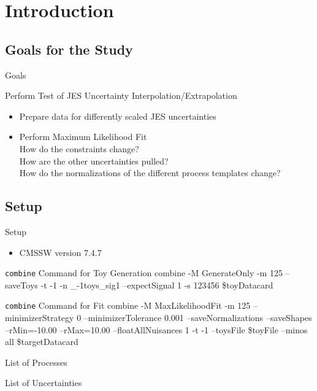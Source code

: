 \section{Introduction}
\subsection{Goals for the Study}
\begin{frame}{Goals}
\begin{block}{Perform Test of JES Uncertainty Interpolation/Extrapolation}
\begin{itemize}
\item Prepare data for differently scaled JES uncertainties\\
\item Perform Maximum Likelihood Fit\\
\rar How do the constraints change?\\
\rar How are the other uncertainties pulled?\\
\rar How do the normalizations of the different process templates change?

\end{itemize}
\end{block}

\end{frame}

\subsection{Setup}
\begin{frame}{Setup}
\begin{itemize}
\item CMSSW version 7.4.7\\
\end{itemize}
\begin{block}{\texttt{combine} Command for Toy Generation}
combine -M GenerateOnly -m 125 --saveToys -t -1 -n \_-1toys\_sig1 --expectSignal 1 -s 123456 \$toyDatacard
\end{block}
\begin{block}{\texttt{combine} Command for Fit}
combine -M MaxLikelihoodFit -m 125 --minimizerStrategy 0 --minimizerTolerance 0.001 --saveNormalizations --saveShapes --rMin=-10.00 --rMax=10.00 --floatAllNuisances 1 -t -1 --toysFile \$toyFile --minos all \$targetDatacard
\end{block}
\end{frame}

\begin{frame}{List of Processes}

\end{frame}
\begin{frame}{List of Uncertainties}

\end{frame}